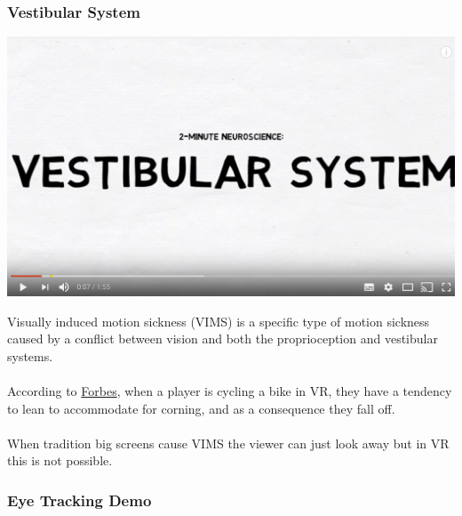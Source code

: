 \begin{frame}
	\frametitle{Vestibular System}
	\begin{center}
		\href{https://www.youtube.com/watch?v=P3aYqxGesqs}{\includegraphics[scale=.3]{assets/vestibular} }
	\end{center}
\end{frame}

\begin{frame}
	Visually induced motion sickness (VIMS) is a specific type of motion sickness caused by a conflict between vision and both the proprioception and vestibular systems.  \\~\\
	
	According to \href{http://www.forbes.com/sites/kevinmurnane/2016/03/28/keeping-your-balance-with-an-oculus-rift/#36ac747823d7}{Forbes}, when a player is cycling a bike in VR, they have a tendency to lean to accommodate for corning, and as a consequence they fall off. \\~\\
	
	When tradition big screens cause VIMS the viewer can just look away but in VR this is not possible. 
	

\end{frame}

\begin{frame}
	\frametitle{Eye Tracking Demo} 
\end{frame}



